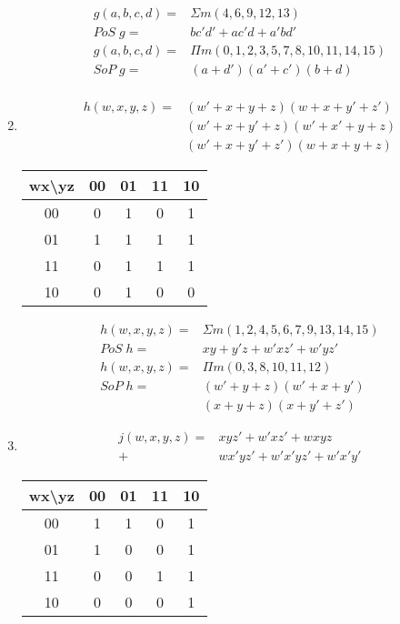 \documentclass[12pt,letterpaper,titlepage]{report}
\begin{document}
\begin{raggedright}
\begin{multicols*}{2}
\begin{enumerate}[noitemsep, label=\alph*)]
\begin{align*}
g(a,b,c,d) =& \Sigma m(4, 6, 9, 12, 13)\\
   PoS\; g =& bc'd'+ac'd+a'bd'\\
g(a,b,c,d) =& \Pi m(0, 1, 2, 3, 5, 7, 8, 10, 11, 14, 15)\\
   SoP\; g =& (a+d')(a'+c')(b+d)\\
\end{align*}
\columnbreak
\item \begin{align*}
	   h(w,x,y,z) =  &(w'+x+y+z)  (w+x+y'+z')
				   \\&(w'+x+y'+z) (w'+x'+y+z)
				   \\&(w'+x+y'+z')(w+x+y+z)
      \end{align*}
\begin{center}
\begin{tabular}{|c||c|c|c|c|}\hline
wx\textbackslash yz
   & 00 & 01 & 11 & 10 \\\hline\hline
00 &  0 &  1 &  0 &  1 \\\hline
01 &  1 &  1 &  1 &  1 \\\hline 
11 &  0 &  1 &  1 &  1 \\\hline
10 &  0 &  1 &  0 &  0 \\\hline
\end{tabular}
\end{center}
\begin{align*}
h(w,x,y,z) =& \Sigma m(1,2,4,5,6,7,9,13,14,15)\\
   PoS\; h =& xy+y'z+w'xz'+w'yz'\\
h(w,x,y,z) =& \Pi m(0,3,8,10,11,12)\\
   SoP\; h =& (w'+y+z)(w'+x+y')
 		  \\& (x+y+z)(x+y'+z')
\end{align*}
\item \begin{align*}
 j(w,x,y,z) =& xyz' + w'xz' + wxyz 
	      \\+& wx'yz' + w'x'yz' + w'x'y'
	  \end{align*}
\begin{center}
\begin{tabular}{|c||c|c|c|c|}\hline
wx\textbackslash yz
   & 00 & 01 & 11 & 10 \\\hline\hline
00 &  1 &  1 &  0 &  1 \\\hline
01 &  1 &  0 &  0 &  1 \\\hline 
11 &  0 &  0 &  1 &  1 \\\hline
10 &  0 &  0 &  0 &  1 \\\hline

\end{tabular}
\end{center}
\end{enumerate}
\end{multicols*}
\end{raggedright}
\end{document}
